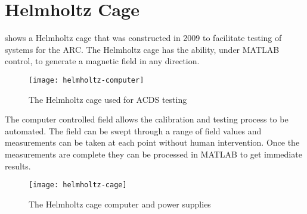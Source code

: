 

\chapter{Helmholtz Cage}

\label{ch:BG}

 shows a Helmholtz cage that was constructed in 2009 to facilitate testing of systems for the \ac{ARC}. The Helmholtz cage has the ability, under MATLAB control, to generate a magnetic field in any direction.

\begin{figure}[!ht]
    \texttt{[image: helmholtz-computer]}
    \caption{The Helmholtz cage used for \acs{ACDS} testing}
    \label{fig:helmholtz-comp}
\end{figure}

The computer controlled field allows the calibration and testing process to be automated. The field can be swept through a range of field values and measurements can be taken at each point without human intervention. Once the measurements are complete they can be processed in MATLAB to get immediate results.

\begin{figure}[!ht]
    \texttt{[image: helmholtz-cage]}
    \caption{The Helmholtz cage computer and power supplies}
    \label{fig:helmholtz}
\end{figure}


